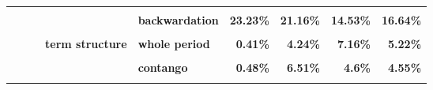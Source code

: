 \documentclass[
  authoryear,
  preprint,
  3p]{elsarticle}
\begin{document}
\begin{landscape}
\begin{longtable}[t]{>{}l>{}l>{}l>{}l>{}l>{}r>{}r>{}r>{}r}
\addlinespace
\textbf{\cellcolor{gray!10}{}} & \textbf{\cellcolor{gray!10}{}} & \textbf{\cellcolor{gray!10}{}} & \textbf{\cellcolor{gray!10}{open interest}} & \textbf{\cellcolor{gray!10}{whole period}} & \textcolor[HTML]{4285f4}{\textbf{\cellcolor{gray!10}{22.08\%}}} & \textcolor[HTML]{4285f4}{\textbf{\cellcolor{gray!10}{27.47\%}}} & \textcolor[HTML]{4285f4}{\textbf{\cellcolor{gray!10}{15.46\%}}} & \textcolor[HTML]{4285f4}{\textbf{\cellcolor{gray!10}{16.03\%}}}\\
\textbf{} & \textbf{} & \textbf{} & \textbf{} & \textbf{backwardation} & \textcolor[HTML]{4285f4}{\textbf{23.23\%}} & \textcolor[HTML]{4285f4}{\textbf{21.16\%}} & \textcolor[HTML]{4285f4}{\textbf{14.53\%}} & \textcolor[HTML]{4285f4}{\textbf{16.64\%}}\\
\textbf{\cellcolor{gray!10}{}} & \textbf{\cellcolor{gray!10}{}} & \textbf{\cellcolor{gray!10}{}} & \textbf{\cellcolor{gray!10}{}} & \textbf{\cellcolor{gray!10}{contango}} & \textcolor[HTML]{4285f4}{\textbf{\cellcolor{gray!10}{20.54\%}}} & \textcolor[HTML]{4285f4}{\textbf{\cellcolor{gray!10}{32.65\%}}} & \textcolor[HTML]{4285f4}{\textbf{\cellcolor{gray!10}{16.18\%}}} & \textcolor[HTML]{4285f4}{\textbf{\cellcolor{gray!10}{15.41\%}}}\\
\textbf{} & \textbf{} & \textbf{} & \textbf{term structure} & \textbf{whole period} & \textcolor[HTML]{4285f4}{\textbf{0.41\%}} & \textcolor[HTML]{4285f4}{\textbf{4.24\%}} & \textcolor[HTML]{4285f4}{\textbf{7.16\%}} & \textcolor[HTML]{4285f4}{\textbf{5.22\%}}\\
\textbf{\cellcolor{gray!10}{}} & \textbf{\cellcolor{gray!10}{}} & \textbf{\cellcolor{gray!10}{}} & \textbf{\cellcolor{gray!10}{}} & \textbf{\cellcolor{gray!10}{backwardation}} & \textcolor[HTML]{4285f4}{\textbf{\cellcolor{gray!10}{0.36\%}}} & \textcolor[HTML]{4285f4}{\textbf{\cellcolor{gray!10}{2.03\%}}} & \textcolor[HTML]{4285f4}{\textbf{\cellcolor{gray!10}{11.66\%}}} & \textcolor[HTML]{4285f4}{\textbf{\cellcolor{gray!10}{5.9\%}}}\\
\addlinespace
\textbf{} & \textbf{} & \textbf{} & \textbf{} & \textbf{contango} & \textcolor[HTML]{4285f4}{\textbf{0.48\%}} & \textcolor[HTML]{4285f4}{\textbf{6.51\%}} & \textcolor[HTML]{4285f4}{\textbf{4.6\%}} & \textcolor[HTML]{4285f4}{\textbf{4.55\%}}\\
\textbf{\cellcolor{gray!10}{}} & \textbf{\cellcolor{gray!10}{}} & \textbf{\cellcolor{gray!10}{petroleum}} & \textbf{\cellcolor{gray!10}{market}} & \textbf{\cellcolor{gray!10}{whole period}} & \textcolor[HTML]{4285f4}{\textbf{\cellcolor{gray!10}{28.98\%}}} & \textcolor[HTML]{4285f4}{\textbf{\cellcolor{gray!10}{35.97\%}}} & \textcolor[HTML]{4285f4}{\textbf{\cellcolor{gray!10}{48.3\%}}} & \textcolor[HTML]{4285f4}{\textbf{\cellcolor{gray!10}{31.91\%}}}\\

\end{longtable}
\end{landscape}
\end{document}
